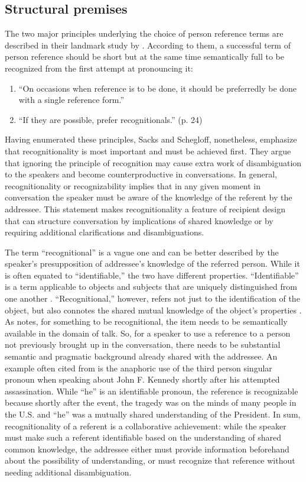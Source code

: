 \documentclass[12pt]{article}
\begin{document}
\subsection{Structural premises}
The two major principles underlying the choice of person reference terms are described in their landmark study by \textcite{sacks1979}. According to them, a successful term of person reference should be short but at the same time semantically full to be recognized from the first attempt at pronouncing it:
\begin{enumerate}
\item ``On occasions when reference is to be done, it should be preferredly be done with a single reference form.''
\item ``If they are possible, prefer recognitionals.'' (p. 24)
\end{enumerate}
Having enumerated these principles, Sacks and Schegloff, nonetheless, emphasize that recognitionality is most important and must be achieved first. They argue that ignoring the principle of recognition may cause extra work of disambiguation to the speakers and become counterproductive in conversations. In general, recognitionality or recognizability implies that in any given moment in conversation the speaker must be aware of the knowledge of the referent by the addressee. This statement makes recognitionality a feature of recipient design that can structure conversation by implications of shared knowledge or by requiring additional clarifications and disambiguations. 

The term ``recognitional'' is a vague one and can be better described by the speaker's presupposition of addressee's knowledge of the referred person. While it is often equated to ``identifiable,'' the two have different properties. ``Identifiable'' is a term applicable to objects and subjects that are uniquely distinguished from one another \parencite{clark1986, chafe1976}. ``Recognitional,'' however, refers not just to the identification of the object, but also connotes the shared mutual knowledge of the object's properties \parencite{clark1986, defornel1987, sacks1979}. As \textcite{chafe1976} notes, for something to be recognitional, the item needs to be semantically available in the domain of talk. So, for a speaker to use a reference to a person not previously brought up in the conversation, there needs to be substantial semantic and pragmatic background already shared with the addressee. An example often cited from \textcite{schegloff2007} is the anaphoric use of the third person singular pronoun when speaking about John F. Kennedy shortly after his attempted assassination. While ``he'' is an identifiable pronoun, the reference is recognizable because shortly after the event, the tragedy was on the minds of many people in the U.S. and ``he'' was a mutually shared understanding of the President. In sum, recognitionality of a referent is a collaborative achievement: while the speaker must make such a referent identifiable based on the understanding of shared common knowledge, the addressee either must provide information beforehand about the possibility of understanding, or must recognize that reference without needing additional disambiguation.
\end{document}
